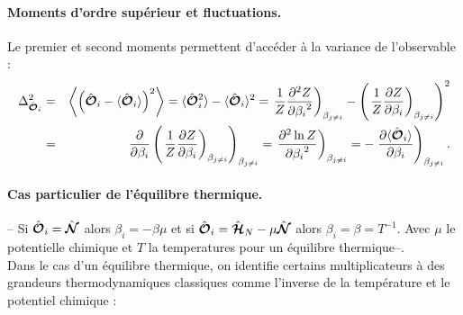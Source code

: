 \paragraph{Moments d’ordre supérieur et fluctuations.}
Le premier et second moments permettent d’accéder à la variance de l’observable :
\begin{eqnarray}
	\Delta_{\hat{\bm{\mathcal{O}}}_i}^2 &=&  	\left \langle \left (\hat{\bm{\mathcal{O}}}_i - \langle\hat{\bm{\mathcal{O}}}_i \rangle \right )^2  \right \rangle  = 	\langle\hat{\bm{\mathcal{O}}}_i^2 \rangle  -  \langle\hat{\bm{\mathcal{O}}}_i \rangle^2 = \left . \frac{1}{Z} \frac{ \partial^2 Z }{ {\partial \beta_i}^2 }  \right )_{\beta_{j\neq i}} - \left ( \left . \frac{1}{Z}\frac{ \partial Z }{ \partial \beta_i }  \right )_{\beta_{j\neq i}}\right )^2  \\
		& = & \frac{\partial}{\partial \beta_i } \left ( \left . \frac{1}{Z} \frac{\partial Z}{\partial \beta_i }  \right )_{\beta_{j\neq i}}  \right )_{\beta_{j\neq i}} =  \left . \frac{\partial^2 \ln Z  }{{\partial \beta_i}^2 }  \right )_{\beta_{j\neq i}}  = - \left . 	\frac{\partial \langle\hat{\bm{\mathcal{O}}}_i \rangle }{\partial \beta_i } \right )_{\beta_{j\neq i}}	.	
\end{eqnarray}

\paragraph{Cas particulier de l’équilibre thermique.}
-- Si $\hat{\bm{\mathcal{O}}}_i = \hat{\bm{\mathcal{N}}}$ alors $\beta_i = - \beta \mu $ et si $\hat{\bm{\mathcal{O}}}_i = \hat{\bm{\mathcal{H}}}_N - \mu \hat{\bm{\mathcal{N}}} $ alors $\beta_i = \beta = T^{-1}$. Avec $\mu$ le potentielle chimique et $T$ la temperatures pour un équilibre thermique--.\\
Dans le cas d’un équilibre thermique, on identifie certains multiplicateurs à des grandeurs thermodynamiques classiques comme l’inverse de la température  et le potentiel chimique :
	

	
	
